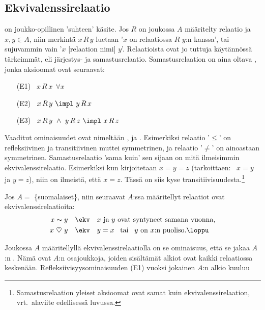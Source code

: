 \subsection*{Ekvivalenssirelaatio}
%

%
 on joukko-opillinen 'suhteen' käsite. Jos $R$ on joukossa $A$ määritelty relaatio
ja $x,y \in A$, niin merkintä $x\,R\,y$ luetaan '$x$ on relaatiossa $R$ $y$:n kanssa', tai
sujuvammin vain '$x$ [relaation nimi] $y$'. Relaatioista ovat jo tuttuja käytännössä tärkeimmät, 
eli järjestys- ja samastusrelaatio.
%
Samastusrelaation on aina oltava , jonka aksioomat ovat seuraavat:
\begin{itemize}
\item[(E1)] \ $x\,R\,x\ \ \forall x$
\item[(E2)] \ $x\,R\,y\ \impl\ y\,R\,x$
\item[(E3)] \ $x\,R\,y\ \wedge\ y\,R\,z\ \impl\ x\,R\,z$
\end{itemize}
 
%
Vaaditut ominaisuudet ovat nimeltään ,  ja 
. Esimerkiksi relaatio '$\le$' on refleksiivinen ja transitiivinen muttei 
symmetrinen, ja relaatio '$\neq$' on ainoastaan symmetrinen. Samastusrelaatio 'sama kuin' sen 
sijaan on mitä ilmeisimmin ekvivalenssirelaatio. Esimerkiksi kun kirjoitetaan $x=y=z$ 
(tarkoittaen: \ $x=y$ ja $y=z$), niin on ilmeistä, että $x=z$. Tässä on siis kyse 
transitiivisuudesta.\footnote[2]{Samastusrelaation yleiset aksioomat ovat samat kuin 
ekvivalenssirelaation, vrt.\ alaviite edellisessä luvussa.}
\begin{Exa} Jos $A =$ \{suomalaiset\}, niin seuraavat $A$:ssa määritellyt relaatiot ovat
ekvivalenssirelaatioita:
\begin{align*}
x \sim y         \quad &\ekv \quad \text{$x$ ja $y$ ovat syntyneet samana vuonna}, \\
x\ \heartsuit\ y \quad &\ekv \quad \text{$y=x\,\ $ tai $\,\ y$ on $x$:n puoliso}. \loppu
\end{align*}
\end{Exa}
Joukossa $A$ määritellyllä ekvivalenssirelaatiolla on se ominaisuus, että se jakaa $A$:n
%
. Nämä ovat $A$:n osajoukkoja, joiden sisältämät alkiot ovat kaikki
relaatiossa keskenään. Refleksiivisyysominaisuuden (E1) vuoksi jokainen $A$:n alkio kuuluu 
